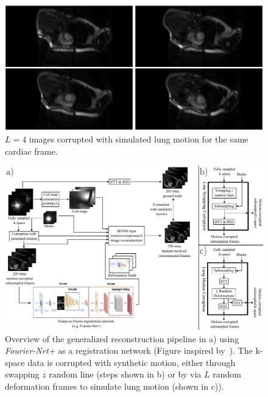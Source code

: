 \begin{figure}[h] %
	\centering
	\includegraphics[width=\linewidth]{./Images/LungMotion.png} 
	\caption{$L=4$ images corrupted with simulated lung motion for the same cardiac frame.}
	\label{fig:LungMotion}
\end{figure}

\begin{figure}[h] %
	\centering
	\includegraphics[width=\linewidth]{./Images/GeneralReconstructionPipeline.pdf} 
	\caption{Overview of the generalized reconstruction pipeline in a) using \emph{Fourier-Net+} as a registration network (Figure inspired by~\cite{Kuestner2022}). The k-space data is corrupted with synthetic motion, either through swapping $z$ random line (steps shown in b) or by via $L$ random deformation frames to simulate lung motion (shown in c)).}
	\label{fig:GeneralReconstructionPipeline}
\end{figure}

